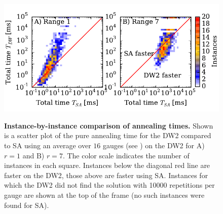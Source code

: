 \begin{figure}
\centering
\includegraphics[width=0.95\columnwidth]{fig06.pdf} \label{fig:ratiosannealing}
\caption{{\bf Instance-by-instance comparison of annealing times.} Shown is a scatter plot of the pure annealing time for the DW2 compared to SA using an average over $16$ gauges (see \cite{SM}) on the DW2 for A) $r=1$ and B) $r=7$.  The color scale indicates the number of instances in each square. Instances below the diagonal red line are faster on the DW2, those above are faster using SA. Instances for which the DW2 did not find the solution with 10000 repetitions per gauge are shown at the top of the frame (no such instances were found for SA). 
}
\label{fig:ratiosannealing}
\end{figure}
